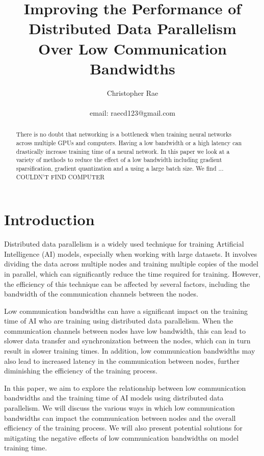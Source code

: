 \documentclass[twocolumn,10pt]{article}
\title{Improving the Performance of Distributed Data Parallelism \\Over Low Communication  Bandwidths}
\author{Christopher Rae \\ \begin{small} email: raecd123@gmail.com \end{small}}
\date{}
\begin{document}
\maketitle


\begin{abstract}
There is no doubt that networking is a bottleneck when training neural networks across multiple GPUs and computers. Having a low bandwidth or a high latency can drastically increase training time of a neural network. In this paper we look at a variety of methods to reduce the effect of a low bandwidth including gradient sparsification, gradient quantization and a using a large batch size. We find ... COULDN'T FIND COMPUTER
\end{abstract}


\section{Introduction}
Distributed data parallelism is a widely used technique for training Artificial Intelligence (AI) models, especially when working with large datasets. It involves dividing the data across multiple nodes and training multiple copies of the model in parallel, which can significantly reduce the time required for training. However, the efficiency of this technique can be affected by several factors, including the bandwidth of the communication channels between the nodes.

Low communication bandwidths can have a significant impact on the training time of AI who are training using distributed data parallelism. When the communication channels between nodes have low bandwidth, this can lead to slower data transfer and synchronization between the nodes, which can in turn result in slower training times. In addition, low communication bandwidths may also lead to increased latency in the communication between nodes, further diminishing the efficiency of the training process.

In this paper, we aim to explore the relationship between low communication bandwidths and the training time of AI models using distributed data parallelism. We will discuss the various ways in which low communication bandwidths can impact the communication between nodes and the overall efficiency of the training process. We will also present potential solutions for mitigating the negative effects of low communication bandwidths on model training time.
\end{document}
